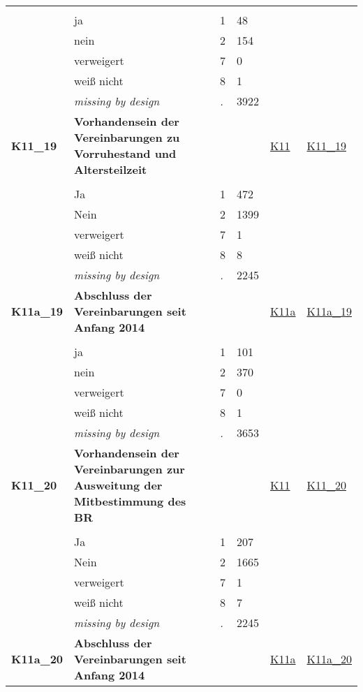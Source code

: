 \begin{longtable}{| L{2.45cm} | L{6cm} | C{1.5cm} | R{1cm} | C{2.25cm} | C{2.25cm} |}
   &  &  &  &  &  \\ 
   & ja & 1 & 48 &  &  \\ 
   & nein & 2 & 154 &  &  \\ 
   & verweigert & 7 & 0 &  &  \\ 
   & weiß nicht & 8 & 1 &  &  \\ 
   & \textit{missing by design} & \textit{.} & 3922 &  &  \\ 
   \midrule
\textbf{K11\_19}\label{var:K11:19} & \textbf{Vorhandensein der Vereinbarungen zu Vorruhestand und Altersteilzeit} &  &  & \hyperref[K11]{K11} & \hyperref[var:suf:K11:19]{K11\_19} \\ 
   &  &  &  &  &  \\ 
   & Ja & 1 & 472 &  &  \\ 
   & Nein & 2 & 1399 &  &  \\ 
   & verweigert & 7 & 1 &  &  \\ 
   & weiß nicht & 8 & 8 &  &  \\ 
   & \textit{missing by design} & \textit{.} & 2245 &  &  \\ 
   \midrule
\textbf{K11a\_19}\label{var:K11a:19} & \textbf{Abschluss der Vereinbarungen seit Anfang 2014} &  &  & \hyperref[K11a]{K11a} & \hyperref[var:suf:K11a:19]{K11a\_19} \\ 
   &  &  &  &  &  \\ 
   & ja & 1 & 101 &  &  \\ 
   & nein & 2 & 370 &  &  \\ 
   & verweigert & 7 & 0 &  &  \\ 
   & weiß nicht & 8 & 1 &  &  \\ 
   & \textit{missing by design} & \textit{.} & 3653 &  &  \\ 
   \midrule
\textbf{K11\_20}\label{var:K11:20} & \textbf{Vorhandensein der Vereinbarungen zur Ausweitung der Mitbestimmung des BR} &  &  & \hyperref[K11]{K11} & \hyperref[var:suf:K11:20]{K11\_20} \\ 
   &  &  &  &  &  \\ 
   & Ja & 1 & 207 &  &  \\ 
   & Nein & 2 & 1665 &  &  \\ 
   & verweigert & 7 & 1 &  &  \\ 
   & weiß nicht & 8 & 7 &  &  \\ 
   & \textit{missing by design} & \textit{.} & 2245 &  &  \\ 
   \midrule
\textbf{K11a\_20}\label{var:K11a:20} & \textbf{Abschluss der Vereinbarungen seit Anfang 2014} &  &  & \hyperref[K11a]{K11a} & \hyperref[var:suf:K11a:20]{K11a\_20} \\ 

\end{longtable}
